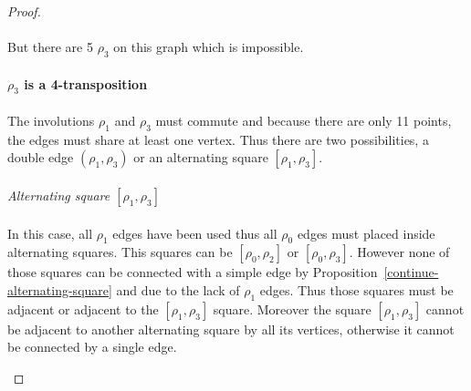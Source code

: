 \begin{proof}
  \paragraph{}
  But there are 5 $\rho_3$ on this graph which is impossible.

  \paragraph{}
  \textbf{$\rho_3$ is a 4-transposition}

  \paragraph{}
  The involutions $\rho_1$ and $\rho_3$ must commute and because there are only 11 points, the edges must share at least one vertex. Thus there are two possibilities, a double edge $(\rho_1, \rho_3)$ or an alternating square $[\rho_1, \rho_3]$.

  \paragraph{}
  \textit{Alternating square $[\rho_1, \rho_3]$}

  \paragraph{}
  In this case, all $\rho_1$ edges have been used thus all $\rho_0$ edges must placed inside alternating squares. This squares can be $[\rho_0, \rho_2]$ or $[\rho_0, \rho_3]$. However none of those squares can be connected with a simple edge by Proposition~\ref{continue-alternating-square} and due to the lack of $\rho_1$ edges. Thus those squares must be adjacent or adjacent to the $[\rho_1, \rho_3]$ square. Moreover the square $[\rho_1, \rho_3]$ cannot be adjacent to another alternating square by all its vertices, otherwise it cannot be connected by a single edge.

  \begin{figure}[H]
    \begin{center}
\end{center}
\end{figure}
\end{proof}
